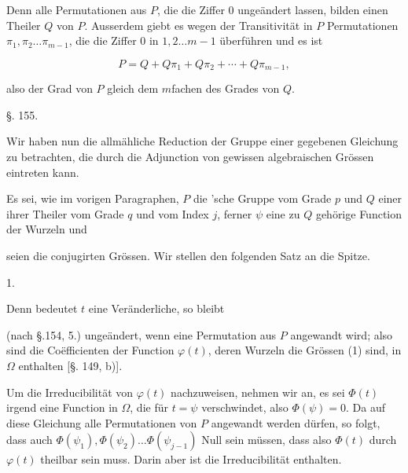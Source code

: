 
Denn alle Permutationen aus $P$, die die Ziffer $0$ ungeändert
lassen, bilden einen Theiler $Q$ von $P$. Ausserdem giebt es wegen
der Transitivität in $P$ Permutationen $\pi_1, \pi_2 \ldots \pi_{m-1}$, die die
Ziffer $0$ in $1, 2 \ldots m-1$ überführen und es ist

\[
P = Q + Q\pi_1 + Q\pi_2 + \cdots + Q\pi_{m-1},
\]

also der Grad von $P$ gleich dem $m$fachen des Grades von $Q$.

\begin{center}
§. 155.

\end{center}

Wir haben nun die allmähliche Reduction der Gruppe einer
gegebenen Gleichung zu betrachten, die durch die Adjunction
von gewissen algebraischen Grössen eintreten kann.

Es sei, wie im vorigen Paragraphen, $P$ die 'sche
Gruppe vom Grade $p$ und $Q$ einer ihrer Theiler vom Grade $q$
und vom Index $j$, ferner $\psi$ eine zu $Q$ gehörige Function der
Wurzeln und


seien die conjugirten Grössen. Wir stellen den folgenden Satz
an die Spitze.

1. 

Denn bedeutet $t$ eine Veränderliche, so bleibt


(nach §.154, 5.) ungeändert, wenn eine Permutation aus $P$ angewandt
 wird; also sind die Coëfficienten der Function $\varphi(t)$, deren
Wurzeln die Grössen (1) sind, in $\Omega$ enthalten [§. 149, b)].

Um die Irreducibilität von $\varphi(t)$ nachzuweisen, nehmen wir
an, es sei $\Phi(t)$ irgend eine Function in $\Omega$, die für $t = \psi$ verschwindet,
also $\Phi(\psi) = 0$. Da auf diese Gleichung alle Permutationen
 von $P$ angewandt werden dürfen, so folgt, dass auch
$\Phi(\psi_1), \Phi(\psi_2) \ldots \Phi(\psi_{j-1})$ Null sein müssen, dass also $\Phi(t)$
durch $\varphi(t)$ theilbar sein muss. Darin aber ist die Irreducibilität
enthalten.
